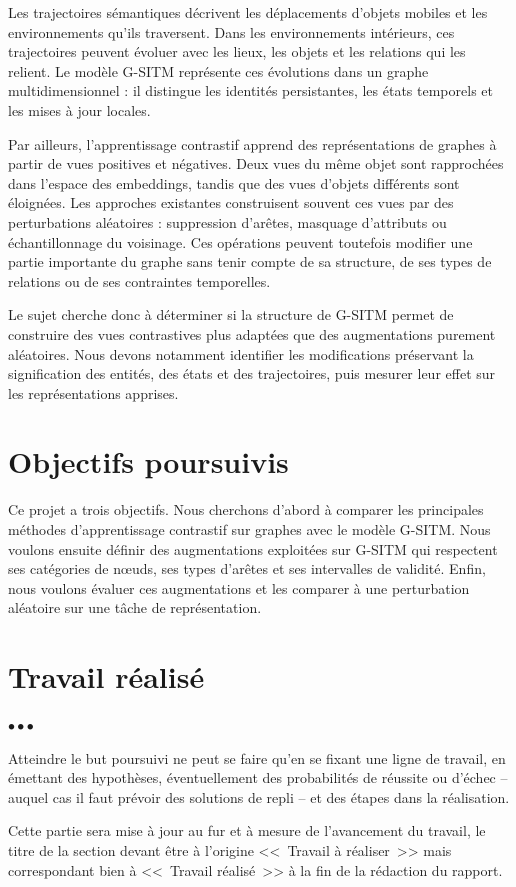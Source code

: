 \documentclass[11pt, french, screen, research-development]{report-rd-info}
\newenvironment{explanation}
{\color{blue}
 \begin{list}{}{\hspace{0.2\textwidth}\color{blue}}\item $\bullet\bullet\bullet$
}
{\end{list}}
\begin{document}
Les trajectoires sémantiques décrivent les déplacements d'objets mobiles et les environnements qu'ils traversent.
Dans les environnements intérieurs, ces trajectoires peuvent évoluer avec les lieux,
les objets et les relations qui les relient.
Le modèle G-SITM représente ces évolutions dans un graphe multidimensionnel :
il distingue les identités persistantes, les états temporels et les mises à jour locales.

Par ailleurs, l'apprentissage contrastif apprend des représentations de graphes
à partir de vues positives et négatives.
Deux vues du même objet sont rapprochées dans l'espace des embeddings,
tandis que des vues d'objets différents sont éloignées.
Les approches existantes construisent souvent ces vues par des perturbations aléatoires :
suppression d'arêtes, masquage d'attributs ou échantillonnage du voisinage.
Ces opérations peuvent toutefois modifier une partie importante du graphe
sans tenir compte de sa structure, de ses types de relations ou de ses contraintes temporelles.

Le sujet cherche donc à déterminer si la structure de G-SITM permet de construire
des vues contrastives plus adaptées que des augmentations purement aléatoires.
Nous devons notamment identifier les modifications préservant la signification
des entités, des états et des trajectoires,
puis mesurer leur effet sur les représentations apprises.

\section{Objectifs poursuivis}

Ce projet a trois objectifs.
Nous cherchons d'abord à comparer les principales méthodes d'apprentissage contrastif
sur graphes avec le modèle G-SITM.
Nous voulons ensuite définir des augmentations exploitées sur G-SITM
qui respectent ses catégories de nœuds, ses types d'arêtes et ses intervalles de validité.
Enfin, nous voulons évaluer ces augmentations
et les comparer à une perturbation aléatoire sur une tâche de représentation.

\section{Travail réalisé}

\begin{explanation}
   Atteindre le but poursuivi ne peut se faire qu'en se fixant une ligne de travail, en émettant des hypothèses, éventuellement des probabilités de réussite ou d'échec -- auquel cas il faut prévoir des solutions de repli -- et des étapes dans la réalisation.

   Cette partie sera mise à jour au fur et à mesure de l'avancement du travail, le titre de la section devant être à l'origine <<~Travail à réaliser~>> mais correspondant bien à <<~Travail réalisé~>> à la fin de la rédaction du rapport.
\end{explanation}
\end{document}
